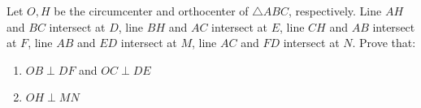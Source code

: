 Let $O,H$ be the circumcenter and orthocenter of $\triangle{ABC}$, respectively. Line $AH$ and $BC$ intersect at $D$, line $BH$ and $AC$ intersect at $E$, line $CH$ and $AB$ intersect at $F$, line $AB$ and $ED$ intersect at $M$, line $AC$ and $FD$ intersect at $N$. Prove that:
\begin{enumerate}[label=(\arabic*)]
	\item $OB\perp DF$ and $OC\perp DE$
	\item $OH\perp MN$
\end{enumerate}

